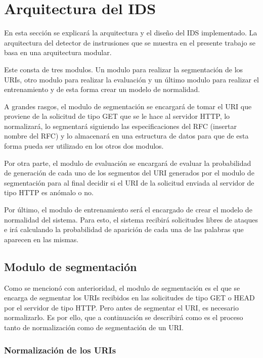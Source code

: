 \chapter{Arquitectura del IDS}
\label{capitulo3}

En esta sección se explicará la arquitectura y el diseño del IDS implementado. 
La arquitectura del detector de instrusiones que se muestra en el presente trabajo se basa en una arquitectura modular.

Este consta de tres modulos. Un modulo para realizar la segmentación de los URIs, otro modulo para realizar la evaluación y un último modulo para realizar el entrenamiento y de esta forma crear un modelo de normalidad.

A grandes rasgos, el modulo de segmentación se encargará de tomar el URI que proviene de la solicitud de tipo GET que se le hace al servidor HTTP, lo normalizará, lo segmentará siguiendo las especificaciones del RFC (insertar nombre del RFC) y lo almacenará en una estructura de datos para que de esta forma pueda ser utilizado en los otros dos modulos.

Por otra parte, el modulo de evaluación se encargará de evaluar la probabilidad de generación de cada uno de los segmentos del URI generados por el modulo de segmentación para al final decidir si el URI de la solicitud enviada al servidor de tipo HTTP es anómalo o no.

Por último, el modulo de entrenamiento será el encargado de crear el modelo de normalidad del sistema. Para esto, el sistema recibirá solicitudes libres de ataques e irá calculando la probabilidad de aparición de cada una de las palabras que aparecen en las mismas.

\section{Modulo de segmentación}

Como se mencionó con anterioridad, el modulo de segmentación es el que se encarga de segmentar los URIs recibidos en las solicitudes de tipo GET o HEAD por el servidor de tipo HTTP. Pero antes de segmentar el URI, es necesario normalizarlo. Es por ello, que a continuación se describirá como es el proceso tanto de normalización como de segmentación de un URI.

\subsection{Normalización de los URIs}
\label{sec:normalizacion}

